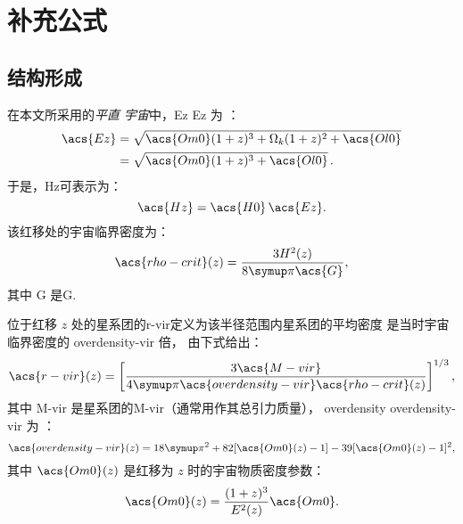 
\chapter{补充公式}
\label{app:formulas}

\section{结构形成}

在本文所采用的\emph{平直 \lcdm 宇宙}中，\acl{Ez} \acs{Ez} 为 \cite{hogg1999}：
\begin{align}
  \label{eq:Ez}
  \acs{Ez}
    & = \sqrt{\acs{Om0} (1+z)^3 + \Omega_k (1+z)^2 + \acs{Ol0}}  \\
    & = \sqrt{\acs{Om0} (1+z)^3 + \acs{Ol0}} \, .
\end{align}
于是，\acl{Hz}可表示为：
\begin{equation}
  \label{eq:hubble-z}
  \acs{Hz} = \acs{H0} \, \acs{Ez} .
\end{equation}
该红移处的宇宙临界密度为：
\begin{equation}
  \label{eq:rho-crit}
  \acs{rho-crit}(z) = \frac{3 H^2(z)}{8 \Cpi \acs{G}} ,
\end{equation}
其中 \acs{G} 是\acl{G}.

位于红移 $z$ 处的星系团的\acf{r-vir}定义为该半径范围内星系团的平均密度
是当时宇宙临界密度的 \acs{overdensity-vir} 倍，
由下式给出：
\begin{equation}
  \label{eq:radius-virial}
  \acs{r-vir}(z) = \left[
    \frac{3 \acs{M-vir}}{4\Cpi \acs{overdensity-vir} \acs{rho-crit}(z)}
  \right]^{1/3},
\end{equation}
其中 \acs{M-vir} 是星系团的\acl{M-vir}（通常用作其总引力质量），
\acf{overdensity} \acs{overdensity-vir} 为 \cite{bryan1998}：
\begin{equation}
  \label{eq:delta-vir}
  \acs{overdensity-vir}(z)
    = 18\Cpi^2 + 82 [\acs{Om0}(z) - 1] - 39 [\acs{Om0}(z) - 1]^2 ,
\end{equation}
其中 $\acs{Om0}(z)$ 是红移为 $z$ 时的宇宙物质密度参数：
\begin{equation}
  \label{eq:omega-m-z}
  \acs{Om0}(z) = \frac{(1+z)^3}{E^2(z)} \acs{Om0} .
\end{equation}

